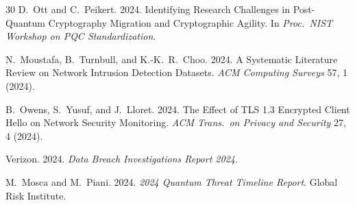 \documentclass[sigconf,nonacm]{acmart}
\begin{document}
\begin{thebibliography}{30}
D.~Ott and C.~Peikert. 2024. Identifying Research Challenges in
Post-Quantum Cryptography Migration and Cryptographic Agility.
In \textit{Proc.\ NIST Workshop on PQC Standardization}.

N.~Moustafa, B.~Turnbull, and K.-K.~R.~Choo. 2024. A Systematic
Literature Review on Network Intrusion Detection Datasets.
\textit{ACM Computing Surveys} 57, 1 (2024).

B.~Owens, S.~Yusuf, and J.~Lloret. 2024. The Effect of TLS 1.3
Encrypted Client Hello on Network Security Monitoring.
\textit{ACM Trans.\ on Privacy and Security} 27, 4 (2024).

Verizon. 2024. \textit{Data Breach Investigations Report 2024}.

M.~Mosca and M.~Piani. 2024. \textit{2024 Quantum Threat Timeline
Report}. Global Risk Institute.

\end{thebibliography}
\end{document}
